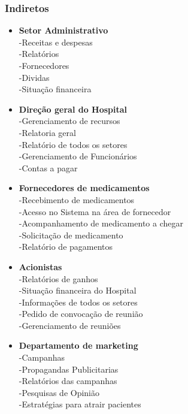 \subsubsection{ Indiretos}

\begin{itemize}
  \item \textbf{Setor Administrativo}\\
-Receitas e despesas\\
-Relatórios\\
-Fornecedores\\
-Dividas\\
-Situação financeira\\


  \item \textbf{Direção geral do Hospital}\\
-Gerenciamento de recursos\\
-Relatoria geral\\
-Relatório de todos os setores\\
-Gerenciamento de Funcionários\\
-Contas a pagar\\


  \item \textbf{Fornecedores de medicamentos}\\
-Recebimento de medicamentos\\
-Acesso no Sistema na área de fornecedor\\
-Acompanhamento de medicamento a chegar\\
-Solicitação de medicamento\\
-Relatório de pagamentos\\




  \item \textbf{Acionistas}\\
-Relatórios de ganhos\\
-Situação financeira do Hospital\\
-Informações de todos os setores\\
-Pedido de convocação de reunião\\
-Gerenciamento de reuniões\\



  \item \textbf{Departamento de marketing}\\
-Campanhas\\
-Propagandas Publicitarias\\
-Relatórios das campanhas\\
-Pesquisas de Opinião\\
-Estratégias para atrair pacientes\\
\end{itemize}

